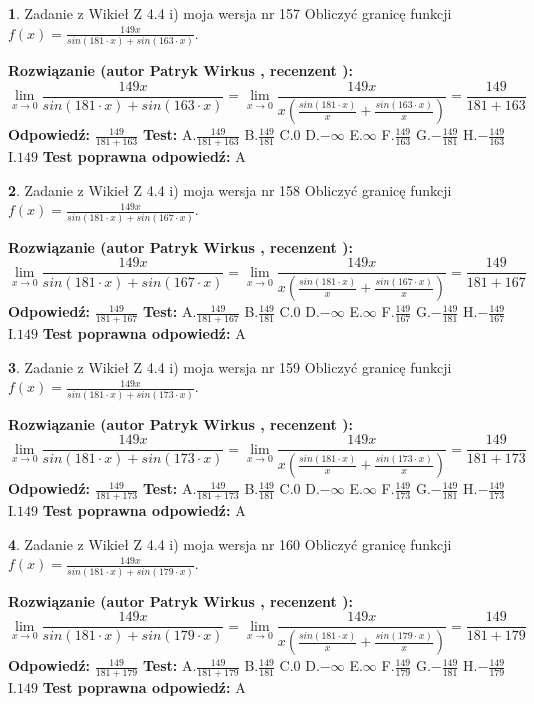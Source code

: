 \documentclass[12pt, a4paper]{article}
\theoremstyle{definition} %
\newtheorem{zad}{}
\newcommand{\zadStart}[1]{\begin{zad}#1\newline}
\newcommand{\zadStop}{\end{zad}}
\newcommand{\rozwStart}[2]{\noindent \textbf{Rozwiązanie (autor #1 , recenzent #2): }\newline}
\newcommand{\rozwStop}{\newline}
\newcommand{\odpStart}{\noindent \textbf{Odpowiedź:}\newline}
\newcommand{\odpStop}{\newline}
\newcommand{\testStart}{\noindent \textbf{Test:}\newline}
\newcommand{\testStop}{\newline}
\newcommand{\kluczStart}{\noindent \textbf{Test poprawna odpowiedź:}\newline}
\newcommand{\kluczStop}{\newline}
\begin{document}
\zadStart{Zadanie z Wikieł Z 4.4 i) moja wersja nr 157}
Obliczyć granicę funkcji $f(x)=\frac{149x}{sin(181\cdot x) +sin(163\cdot x)}$.
\zadStop
\rozwStart{Patryk Wirkus}{}
$$\lim\limits_{x\to 0}\frac{149x}{sin(181\cdot x) +sin(163\cdot x)}=\lim\limits_{x\to 0}\frac{149x}{x(\frac{sin(181\cdot x)}{x}+\frac{sin(163\cdot x)}{x})}=\frac{149}{181+163}$$
\rozwStop
\odpStart
$\frac{149}{181+163}$
\odpStop
\testStart
A.$\frac{149}{181+163}$
B.$\frac{149}{181}$
C.$0$
D.$-\infty$
E.$\infty$
F.$\frac{149}{163}$
G.$-\frac{149}{181}$
H.$-\frac{149}{163}$
I.$149$
\testStop
\kluczStart
A
\kluczStop



\zadStart{Zadanie z Wikieł Z 4.4 i) moja wersja nr 158}
Obliczyć granicę funkcji $f(x)=\frac{149x}{sin(181\cdot x) +sin(167\cdot x)}$.
\zadStop
\rozwStart{Patryk Wirkus}{}
$$\lim\limits_{x\to 0}\frac{149x}{sin(181\cdot x) +sin(167\cdot x)}=\lim\limits_{x\to 0}\frac{149x}{x(\frac{sin(181\cdot x)}{x}+\frac{sin(167\cdot x)}{x})}=\frac{149}{181+167}$$
\rozwStop
\odpStart
$\frac{149}{181+167}$
\odpStop
\testStart
A.$\frac{149}{181+167}$
B.$\frac{149}{181}$
C.$0$
D.$-\infty$
E.$\infty$
F.$\frac{149}{167}$
G.$-\frac{149}{181}$
H.$-\frac{149}{167}$
I.$149$
\testStop
\kluczStart
A
\kluczStop



\zadStart{Zadanie z Wikieł Z 4.4 i) moja wersja nr 159}
Obliczyć granicę funkcji $f(x)=\frac{149x}{sin(181\cdot x) +sin(173\cdot x)}$.
\zadStop
\rozwStart{Patryk Wirkus}{}
$$\lim\limits_{x\to 0}\frac{149x}{sin(181\cdot x) +sin(173\cdot x)}=\lim\limits_{x\to 0}\frac{149x}{x(\frac{sin(181\cdot x)}{x}+\frac{sin(173\cdot x)}{x})}=\frac{149}{181+173}$$
\rozwStop
\odpStart
$\frac{149}{181+173}$
\odpStop
\testStart
A.$\frac{149}{181+173}$
B.$\frac{149}{181}$
C.$0$
D.$-\infty$
E.$\infty$
F.$\frac{149}{173}$
G.$-\frac{149}{181}$
H.$-\frac{149}{173}$
I.$149$
\testStop
\kluczStart
A
\kluczStop



\zadStart{Zadanie z Wikieł Z 4.4 i) moja wersja nr 160}
Obliczyć granicę funkcji $f(x)=\frac{149x}{sin(181\cdot x) +sin(179\cdot x)}$.
\zadStop
\rozwStart{Patryk Wirkus}{}
$$\lim\limits_{x\to 0}\frac{149x}{sin(181\cdot x) +sin(179\cdot x)}=\lim\limits_{x\to 0}\frac{149x}{x(\frac{sin(181\cdot x)}{x}+\frac{sin(179\cdot x)}{x})}=\frac{149}{181+179}$$
\rozwStop
\odpStart
$\frac{149}{181+179}$
\odpStop
\testStart
A.$\frac{149}{181+179}$
B.$\frac{149}{181}$
C.$0$
D.$-\infty$
E.$\infty$
F.$\frac{149}{179}$
G.$-\frac{149}{181}$
H.$-\frac{149}{179}$
I.$149$
\testStop
\kluczStart
A
\kluczStop
\end{document}
